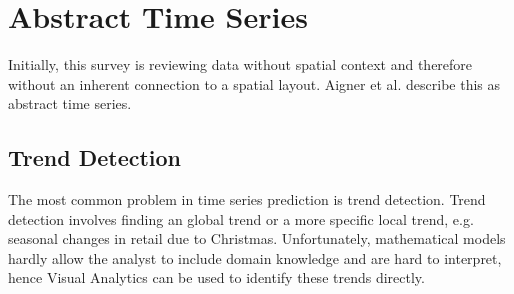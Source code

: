 \documentclass[electronic]{vgtc}             %
\begin{document}
\section{Abstract Time Series\label{sec:temporal}}
Initially, this survey is reviewing data without spatial context and therefore without an inherent connection to a spatial layout.
Aigner et al. \cite{Aigner:2007} describe this as abstract time series. 

\subsection{Trend Detection\label{subsec:trend}}
The most common problem in time series prediction is trend detection.
Trend detection involves finding an global trend or a more specific local trend, e.g. seasonal changes in retail due to Christmas.
Unfortunately, mathematical models hardly allow the analyst to include domain knowledge and are hard to interpret, hence Visual Analytics can be used to identify these trends directly.
\end{document}
